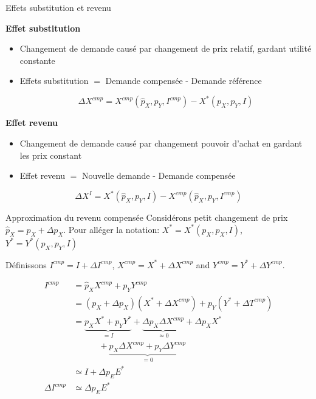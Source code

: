 \documentclass[handout]{beamer}
\newenvironment{iPar}[1]{\textbf{#1} \begin{itemize}}{\end{itemize}}
\newcommand{\cp}{{cmp}}
\begin{document}
\begin{frame}{Effets substitution et revenu}

\begin{iPar}{Effet substitution}
\item  Changement de demande causé par changement de prix relatif, gardant utilité constante
\item Effets substitution $=$ Demande compensée - Demande référence

$$ \Delta X^{\cp} =  X^\cp(\hat p_X,p_Y,I^\cp) - X^*(p_X,p_Y,I) $$

\end{iPar}

\begin{iPar}{Effet revenu}
\item  Changement de demande causé par changement pouvoir d'achat en gardant les prix constant
\item Effet revenu $=$ Nouvelle demande - Demande compensée
\end{iPar}
$$ \Delta X^{I} = X^*(\hat p_X,p_Y,I) - X^\cp(\hat p_X,p_Y,I^\cp) $$

\end{frame}

\begin{frame}{Approximation du revenu compensée}
Considérons petit changement de prix $\hat p_X = p_X + \Delta p_X$. Pour alléger la notation: $X^* = X^*(p_X,p_X,I)$, $Y^* = Y^*(p_X,p_Y,I)$\\ \smallskip

Définissons $I^\cp  = I + \Delta I^\cp$, $X^\cp = X^* + \Delta X^\cp$ and  $Y^\cp  = Y^* + \Delta Y^\cp$.

\begin{align*}
I^\cp & =  \hat p_X X^\cp +  p_Y Y^\cp\\
 & =  (p_X + \Delta p_X)(X^* + \Delta X^\cp) + p_Y(Y^* + \Delta T^\cp)\\ 
  &=  \underbrace{p_X X^* + p_YY^*}_{=I} +\underbrace{\Delta p_X \Delta X^\cp}_{\simeq 0} + \Delta p_X X^* \\
  & \quad \quad \quad + \underbrace{ p_X\Delta X^{\cp} + p_Y \Delta Y^{\cp}}_{=0}\\ & \simeq I+  \Delta p_E E^* \\
 \Delta I^\cp  &\simeq \Delta p_E E^*
\end{align*}
\end{frame}
\end{document}
